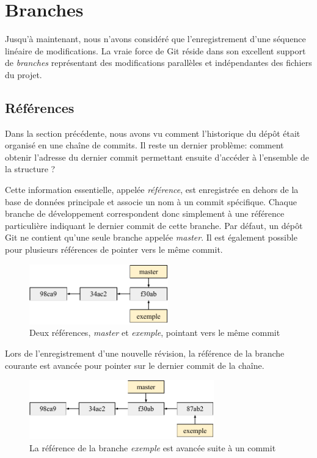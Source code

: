 \documentclass[11pt,a4paper]{article}
\begin{document}
\section{Branches}

Jusqu'à maintenant, nous n'avons considéré que l'enregistrement d'une séquence linéaire de modifications. La vraie force de Git réside dans son excellent support de \textit{branches} représentant des modifications parallèles et indépendantes des fichiers du projet.

\subsection{Références}

Dans la section précédente, nous avons vu comment l'historique du dépôt était organisé en une chaîne de commits. Il reste un dernier problème: comment obtenir l'adresse du dernier commit permettant ensuite d'accéder à l'ensemble de la structure ?

Cette information essentielle, appelée \textit{référence}, est enregistrée en dehors de la base de données principale et associe un nom à un commit spécifique. Chaque branche de développement correspondent donc simplement à une référence particulière indiquant le dernier commit de cette branche. Par défaut, un dépôt Git ne contient qu'une seule branche appelée \textit{master}. Il est également possible pour plusieurs références de pointer vers le même commit.

\begin{figure}[h]
\begin{center}
\includegraphics[width=6cm]{img_refs}
\caption{Deux références, \textit{master} et \textit{exemple}, pointant vers le même commit}
\end{center}
\end{figure}

Lors de l'enregistrement d'une nouvelle révision, la référence de la branche courante est avancée pour pointer sur le dernier commit de la chaîne.

\begin{figure}[h]
\begin{center}
\includegraphics[width=8cm]{img_refs2}
\caption{La référence de la branche \textit{exemple} est avancée suite à un commit}
\end{center}
\end{figure}
\end{document}
